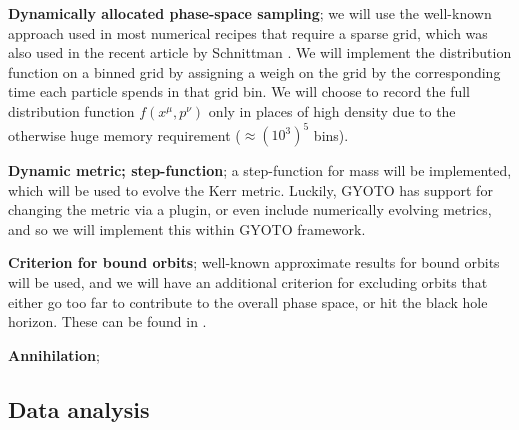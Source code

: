 \documentclass[12pt]{article}
\begin{document}
\textbf{Dynamically allocated phase-space sampling}; we will use the well-known approach used in most numerical recipes that require 
a sparse grid, which was also used in the recent article by Schnittman \citep{schnittman2015}. %
We will implement the distribution function on a binned grid by assigning a weigh on the grid by the corresponding time each particle spends in 
that grid bin. We will choose to record the full distribution function $f(x^\mu,p^\nu)$ only in places of high density due to the otherwise 
huge memory requirement ($\approx (10^3)^5$ bins)\citep{schnittman2015}.

\textbf{Dynamic metric; step-function}; a step-function for mass will be implemented, which will be used to evolve the Kerr metric. 
Luckily, GYOTO has support for changing the metric via a plugin, or even include numerically evolving metrics, and so we will 
implement this within GYOTO framework.

\textbf{Criterion for bound orbits}; well-known approximate results for bound orbits will be used, and we will have an additional criterion 
for excluding orbits that either go too far to contribute to the overall phase space, or hit the black hole horizon. These can be found in 
\citep{Sadeghian_Ferrer_Will_2013, schnittman2015}.

\textbf{Annihilation}; 




\subsection{Data analysis}

\end{document}
